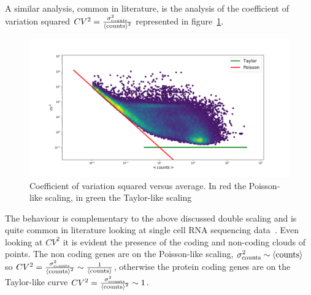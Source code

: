 A similar analysis, common in literature, is the analysis of the coefficient of variation squared $CV^2=\frac{\sigma^2_{\mathrm{counts}}}{\left\langle \mathrm{counts}\right\rangle^2}$ represented in figure~\ref{fig:scalinglaws/gtex/allgenes/cvmean_loglog}.
\begin{figure}[htb!]
    \centering
    \includegraphics[width=0.9\linewidth]{pictures/scalinglaws/gtex/allgenes/cvmean_loglog.png}
    \caption{Coefficient of variation squared versus average. In red the Poisson-like scaling, in green the Taylor-like scaling}
    \label{fig:scalinglaws/gtex/allgenes/cvmean_loglog}
\end{figure}
The behaviour is complementary to the above discussed double scaling and is quite common in literature looking at single cell RNA sequencing data~\cite{Islam2013}. Even looking at $CV^2$ it is evident the presence of the coding and non-coding clouds of points. The non coding genes are on the Poisson-like scaling, $\sigma^2_{\mathrm{counts}} \sim \left\langle \mathrm{counts}\right\rangle$ so $CV^2=\frac{\sigma^2_{\mathrm{counts}}}{\left\langle \mathrm{counts}\right\rangle^2}\sim\frac{1}{\left\langle \mathrm{counts}\right\rangle}$, otherwise the protein coding genes are on the Taylor-like curve $CV^2=\frac{\sigma^2_{\mathrm{counts}}}{\left\langle \mathrm{counts}\right\rangle^2}\sim 1$.

